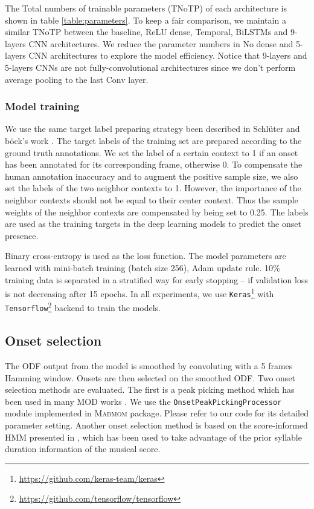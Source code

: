 The Total numbers of trainable parameters (TNoTP) of each architecture is shown in table \ref{table:parameters}. To keep a fair comparison, we maintain a similar TNoTP between the baseline, ReLU dense, Temporal, BiLSTMs and 9-layers CNN architectures. We reduce the parameter numbers in No dense and 5-layers CNN architectures to explore the model efficiency. Notice that 9-layers and 5-layers CNNs are not fully-convolutional architectures \cite{Long2015} since we don't perform average pooling to the last Conv layer.

\subsubsection{Model training}\label{sec:ch5:model_training_improving}

We use the same target label preparing strategy been described in Schl\"{u}ter and b\"{o}ck's work \cite{Schluter2014}. The target labels of the training set are prepared according to the ground truth annotations. We set the label of a certain context to 1 if an onset has been annotated for its corresponding frame, otherwise 0. To compensate the human annotation inaccuracy and to augment the positive sample size, we also set the labels of the two neighbor contexts to 1. However, the importance of the neighbor contexts should not be equal to their center context. Thus the sample weights of the neighbor contexts are compensated by being set to 0.25. The labels are used as the training targets in the deep learning models to predict the onset presence.

Binary cross-entropy is used as the loss function. The model parameters are learned with mini-batch training (batch size 256), Adam \cite{kingma2014adam} update rule. 10\% training data is separated in a stratified way for early stopping -- if validation loss is not decreasing after 15 epochs. In all experiments, we use \texttt{Keras}\footnote{\url{https://github.com/keras-team/keras}} with \texttt{Tensorflow}\footnote{\url{https://github.com/tensorflow/tensorflow}} backend to train the models.

\subsection{Onset selection}\label{sec:ch5:onset_selection_improving}
The ODF output from the model is smoothed by convoluting with a 5 frames Hamming window. Onsets are then selected on the smoothed ODF. Two onset selection methods are evaluated.  The first is a peak picking method which has been used in many MOD works \cite{Bock2012c, Schluter2014,Vogl2017DrumTV}. We use the \texttt{OnsetPeakPickingProcessor} module implemented in \textsc{Madmom} \cite{Bock2016} package. Please refer to our code for its detailed parameter setting. Another onset selection method is based on the score-informed HMM presented in , which has been used to take advantage of the prior syllable duration information of the musical score.

